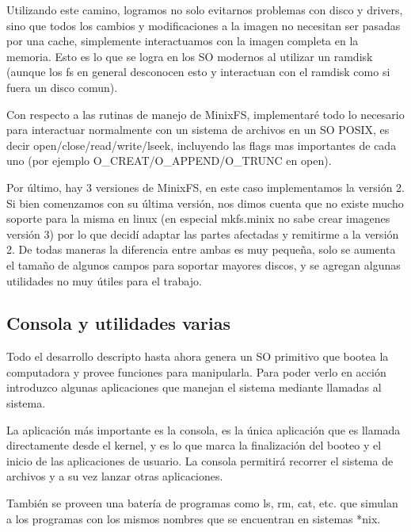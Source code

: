Utilizando este camino, logramos no solo evitarnos problemas con disco y
drivers, sino que todos los cambios y modificaciones a la imagen no necesitan
ser pasadas por una cache, simplemente interactuamos con la imagen completa en
la memoria. Esto es lo que se logra en los SO modernos al utilizar un ramdisk
(aunque los fs en general desconocen esto y interactuan con el ramdisk como si
fuera un disco comun).

Con respecto a las rutinas de manejo de MinixFS, implementaré todo lo necesario
para interactuar normalmente con un sistema de archivos en un SO POSIX, es decir
open/close/read/write/lseek, incluyendo las flags mas importantes de cada uno
(por ejemplo O\_CREAT/O\_APPEND/O\_TRUNC en open).

Por último, hay 3 versiones de MinixFS, en este caso implementamos la versión 2.
Si bien comenzamos con su última versión, nos dimos cuenta que no existe mucho
soporte para la misma en linux (en especial mkfs.minix no sabe crear imagenes
versión 3) por lo que decidí adaptar las partes afectadas y remitirme a la
versión 2. De todas maneras la diferencia entre ambas es muy pequeña, solo se
aumenta el tamaño de algunos campos para soportar mayores discos, y se agregan
algunas utilidades no muy útiles para el trabajo.

\subsection{Consola y utilidades varias}

Todo el desarrollo descripto hasta ahora genera un SO primitivo que bootea la
computadora y provee funciones para manipularla. Para poder verlo en acción
introduzco algunas aplicaciones que manejan el sistema mediante llamadas al
sistema.

La aplicación más importante es la consola, es la única aplicación que es
llamada directamente desde el kernel, y es lo que marca la finalización del
booteo y el inicio de las aplicaciones de usuario. La consola permitirá recorrer
el sistema de archivos y a su vez lanzar otras aplicaciones.

También se proveen una batería de programas como ls, rm, cat, etc. que simulan a
los programas con los mismos nombres que se encuentran en sistemas *nix.
